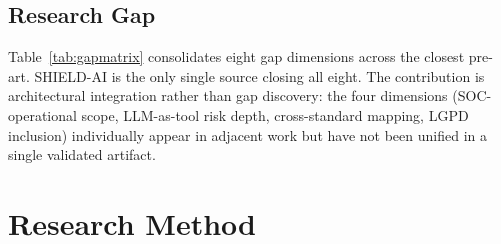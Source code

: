 \documentclass[journal]{IEEEtran}
\begin{document}
\subsection{Research Gap}
Table~\ref{tab:gapmatrix} consolidates eight gap dimensions across the closest pre-art.
SHIELD-AI is the only single source closing all eight. The contribution is architectural
integration rather than gap discovery: the four dimensions (SOC-operational scope, LLM-as-tool
risk depth, cross-standard mapping, LGPD inclusion) individually appear in adjacent work but
have not been unified in a single validated artifact.

\begin{table}[!t]
\renewcommand{\arraystretch}{1.2}
\caption{Research gap matrix. $\checkmark$=primary, $\sim$=partial, n/a=not covered.}
\label{tab:gapmatrix}
\centering
\scriptsize
{}%
\end{table}

\section{Research Method}
\label{sec:method}
\end{document}
